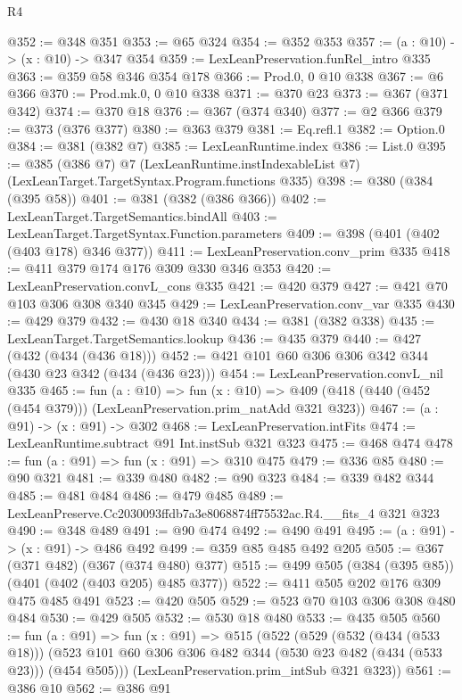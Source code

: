 \begin{lexlean}{R4}
\begin{coremodule}
@352 := @348 @351
@353 := @65 @324
@354 := @352 @353
@357 := (a : @10) -> (x : @10) -> @347 @354
@359 := LexLeanPreservation.funRel_intro @335
@363 := @359 @58 @346 @354 @178
@366 := Prod.{0, 0} @10 @338
@367 := @6 @366
@370 := Prod.mk.{0, 0} @10 @338
@371 := @370 @23
@373 := @367 (@371 @342)
@374 := @370 @18
@376 := @367 (@374 @340)
@377 := @2 @366
@379 := @373 (@376 @377)
@380 := @363 @379
@381 := Eq.refl.{1}
@382 := Option.{0}
@384 := @381 (@382 @7)
@385 := LexLeanRuntime.index
@386 := List.{0}
@395 := @385
    (@386 @7)
    @7
    (LexLeanRuntime.instIndexableList @7)
    (LexLeanTarget.TargetSyntax.Program.functions @335)
@398 := @380 (@384 (@395 @58))
@401 := @381 (@382 (@386 @366))
@402 := LexLeanTarget.TargetSemantics.bindAll
@403 := LexLeanTarget.TargetSyntax.Function.parameters
@409 := @398 (@401 (@402 (@403 @178) @346 @377))
@411 := LexLeanPreservation.conv_prim @335
@418 := @411 @379 @174 @176 @309 @330 @346 @353
@420 := LexLeanPreservation.convL_cons @335
@421 := @420 @379
@427 := @421 @70 @103 @306 @308 @340 @345
@429 := LexLeanPreservation.conv_var @335
@430 := @429 @379
@432 := @430 @18 @340
@434 := @381 (@382 @338)
@435 := LexLeanTarget.TargetSemantics.lookup
@436 := @435 @379
@440 := @427 (@432 (@434 (@436 @18)))
@452 := @421 @101 @60 @306 @306 @342 @344 (@430 @23 @342 (@434 (@436 @23)))
@454 := LexLeanPreservation.convL_nil @335
@465 := fun (a : @10) =>
  fun (x : @10) => @409 (@418 (@440 (@452 (@454 @379))) (LexLeanPreservation.prim_natAdd @321 @323))
@467 := (a : @91) -> (x : @91) -> @302
@468 := LexLeanPreservation.intFits
@474 := LexLeanRuntime.subtract @91 Int.instSub @321 @323
@475 := @468 @474
@478 := fun (a : @91) => fun (x : @91) => @310 @475
@479 := @336 @85
@480 := @90 @321
@481 := @339 @480
@482 := @90 @323
@484 := @339 @482 @344
@485 := @481 @484
@486 := @479 @485
@489 := LexLeanPreserve.Cc2030093ffdb7a3e8068874ff75532ac.R4.__fits_4 @321 @323
@490 := @348 @489
@491 := @90 @474
@492 := @490 @491
@495 := (a : @91) -> (x : @91) -> @486 @492
@499 := @359 @85 @485 @492 @205
@505 := @367 (@371 @482) (@367 (@374 @480) @377)
@515 := @499 @505 (@384 (@395 @85)) (@401 (@402 (@403 @205) @485 @377))
@522 := @411 @505 @202 @176 @309 @475 @485 @491
@523 := @420 @505
@529 := @523 @70 @103 @306 @308 @480 @484
@530 := @429 @505
@532 := @530 @18 @480
@533 := @435 @505
@560 := fun (a : @91) =>
  fun (x : @91) =>
  @515
    (@522
      (@529
        (@532 (@434 (@533 @18)))
        (@523 @101 @60 @306 @306 @482 @344 (@530 @23 @482 (@434 (@533 @23))) (@454 @505)))
      (LexLeanPreservation.prim_intSub @321 @323))
@561 := @386 @10
@562 := @386 @91

\end{coremodule}
\end{lexlean}
